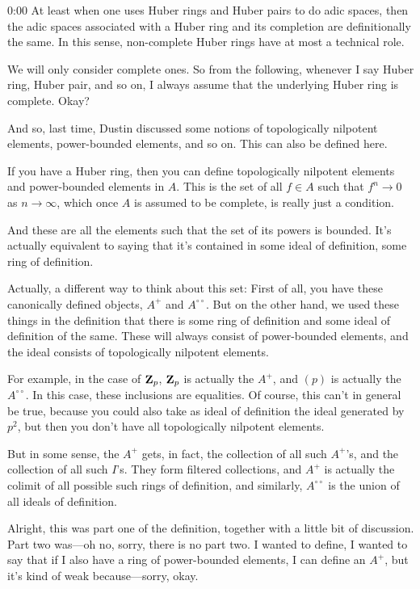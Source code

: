 \begin{unfinished}{0:00}
At least when one uses Huber rings and Huber pairs to do adic spaces, then the adic spaces associated with a Huber ring and its completion are definitionally the same. In this sense, non-complete Huber rings have at most a technical role.

We will only consider complete ones. So from the following, whenever I say Huber ring, Huber pair, and so on, I always assume that the underlying Huber ring is complete. Okay?

And so, last time, Dustin discussed some notions of topologically nilpotent elements, power-bounded elements, and so on. This can also be defined here.

If you have a Huber ring, then you can define topologically nilpotent elements and power-bounded elements in $A$. This is the set of all $f \in A$ such that $f^n \to 0$ as $n \to \infty$, which once $A$ is assumed to be complete, is really just a condition.

And these are all the elements such that the set of its powers is bounded. It's actually equivalent to saying that it's contained in some ideal of definition, some ring of definition.

Actually, a different way to think about this set: First of all, you have these canonically defined objects, $A^+$ and $A^{\circ\circ}$. But on the other hand, we used these things in the definition that there is some ring of definition and some ideal of definition of the same. These will always consist of power-bounded elements, and the ideal consists of topologically nilpotent elements.

For example, in the case of $\mathbf Z_p$, $\mathbf Z_p$ is actually the $A^+$, and $(p)$ is actually the $A^{\circ\circ}$. In this case, these inclusions are equalities. Of course, this can't in general be true, because you could also take as ideal of definition the ideal generated by $p^2$, but then you don't have all topologically nilpotent elements.

But in some sense, the $A^+$ gets, in fact, the collection of all such $A^+$'s, and the collection of all such $I$'s. They form filtered collections, and $A^+$ is actually the colimit of all possible such rings of definition, and similarly, $A^{\circ\circ}$ is the union of all ideals of definition.

Alright, this was part one of the definition, together with a little bit of discussion. Part two was---oh no, sorry, there is no part two. I wanted to define, I wanted to say that if I also have a ring of power-bounded elements, I can define an $A^+$, but it's kind of weak because---sorry, okay.


\end{unfinished}
